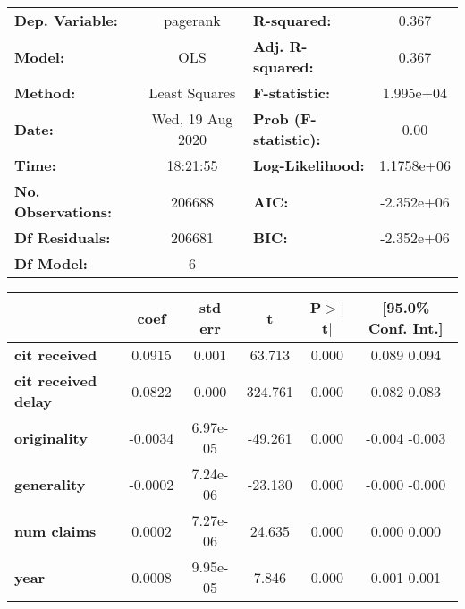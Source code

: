 \begin{center}
\begin{tabular}{lclc}
\toprule
\textbf{Dep. Variable:}     &     pagerank     & \textbf{  R-squared:         } &       0.367     \\
\textbf{Model:}             &       OLS        & \textbf{  Adj. R-squared:    } &       0.367     \\
\textbf{Method:}            &  Least Squares   & \textbf{  F-statistic:       } &   1.995e+04     \\
\textbf{Date:}              & Wed, 19 Aug 2020 & \textbf{  Prob (F-statistic):} &       0.00      \\
\textbf{Time:}              &     18:21:55     & \textbf{  Log-Likelihood:    } &   1.1758e+06    \\
\textbf{No. Observations:}  &      206688      & \textbf{  AIC:               } &   -2.352e+06    \\
\textbf{Df Residuals:}      &      206681      & \textbf{  BIC:               } &   -2.352e+06    \\
\textbf{Df Model:}          &           6      & \textbf{                     } &                 \\
\bottomrule
\end{tabular}
\begin{tabular}{lccccc}
                            & \textbf{coef} & \textbf{std err} & \textbf{t} & \textbf{P$>$$|$t$|$} & \textbf{[95.0\% Conf. Int.]}  \\
\midrule
\textbf{cit received}       &       0.0915  &        0.001     &    63.713  &         0.000        &         0.089     0.094       \\
\textbf{cit received delay} &       0.0822  &        0.000     &   324.761  &         0.000        &         0.082     0.083       \\
\textbf{originality}        &      -0.0034  &     6.97e-05     &   -49.261  &         0.000        &        -0.004    -0.003       \\
\textbf{generality}         &      -0.0002  &     7.24e-06     &   -23.130  &         0.000        &        -0.000    -0.000       \\
\textbf{num claims}         &       0.0002  &     7.27e-06     &    24.635  &         0.000        &         0.000     0.000       \\
\textbf{year}               &       0.0008  &     9.95e-05     &     7.846  &         0.000        &         0.001     0.001       \\

\end{tabular}
\end{center}
